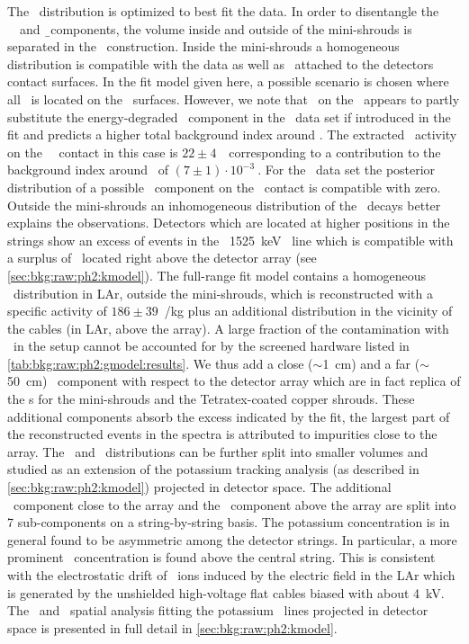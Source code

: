 The \kvz\ distribution is optimized to best fit the data. In order to disentangle the
\kvz\ \g\  and \b\ components, the volume inside and outside of the mini-shrouds is
separated in the \pdf\ construction. Inside the mini-shrouds a homogeneous distribution is
compatible with the data as well as \kvz\ attached to the detectors contact surfaces. In
the fit model given here, a possible scenario is chosen where all \kvz\ is located on the
\nplus\ surfaces. However, we note that \kvz\ on the \pplus\ appears to partly substitute
the energy-degraded \a\ component in the \enrCoaxII\ data set if introduced in the fit and
predicts a higher total background index around \qbb. The extracted \kvz\ activity on the
\scoax\ \pplus\ contact in this case is $22\pm4$~\mubq\ corresponding to a
contribution to the background index around \qbb\ of $(7\pm1)\cdot10^{-3}~$\ctsper. For the \enrBEGeII\
data set the posterior distribution of a possible \kvz\ component on the \pplus\ contact
is compatible with zero. Outside the mini-shrouds an inhomogeneous distribution of the
\kvz\ decays better explains the observations. Detectors which are located at higher
positions in the strings show an excess of events in the \kvz\ 1525~keV \g\ line which is
compatible with a surplus of \kvz\ located right above the detector array (see
\cref{sec:bkg:raw:ph2:kmodel}). The full-range fit model contains a homogeneous \kvz\
distribution in LAr, outside the mini-shrouds, which is reconstructed with a specific
activity of $186\pm39$~\mubq/kg plus an additional distribution in the vicinity of the
cables (in LAr, above the array).
\newpar
A large fraction of the contamination with \kvn\ in the setup cannot be accounted for by
the screened hardware listed in \cref{tab:bkg:raw:ph2:gmodel:results}. We thus add a close
($\sim$1~cm) and a far ($\sim$50~cm) \kvn\ component with respect to the detector array
which are in fact replica of the \pdf{}s for the mini-shrouds and the Tetratex\reg-coated copper
shrouds. These additional components absorb the excess indicated by the fit, the largest
part of the reconstructed events in the spectra is attributed to impurities close to the
array.
\newpar
The \kvn\ and \kvz\ distributions can be further split into smaller volumes and studied as
an extension of the potassium tracking analysis (as described in
\cref{sec:bkg:raw:ph2:kmodel}) projected in detector space. The additional \kvn\ component
close to the array and the \kvz\ component above the array are split into 7 sub-components
on a string-by-string basis. The potassium concentration is in general found to be
asymmetric among the detector strings. In particular, a more prominent \kvz\ concentration
is found above the central string. This is consistent with the electrostatic drift of
\kvz\ ions induced by the electric field in the LAr which is generated by the unshielded
high-voltage flat cables biased with about 4~kV. The \kvn\ and \kvz\ spatial analysis
fitting the potassium \g\ lines projected in detector space is presented in full detail in
\cref{sec:bkg:raw:ph2:kmodel}.

